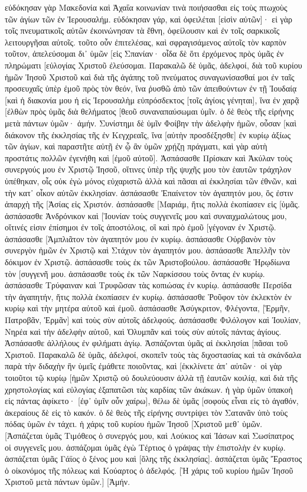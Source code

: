 εὐδόκησαν γὰρ Μακεδονία καὶ Ἀχαΐα κοινωνίαν τινὰ ποιήσασθαι εἰς τοὺς πτωχοὺς τῶν ἁγίων τῶν ἐν Ἰερουσαλήμ. 
εὐδόκησαν γάρ, καὶ ὀφειλέται [εἰσὶν αὐτῶν]· εἰ γὰρ τοῖς πνευματικοῖς αὐτῶν ἐκοινώνησαν τὰ ἔθνη, ὀφείλουσιν καὶ ἐν τοῖς σαρκικοῖς λειτουργῆσαι αὐτοῖς. 
τοῦτο οὖν ἐπιτελέσας, καὶ σφραγισάμενος αὐτοῖς τὸν καρπὸν τοῦτον, ἀπελεύσομαι δι᾽ ὑμῶν [εἰς Σπανίαν· 
οἶδα δὲ ὅτι ἐρχόμενος πρὸς ὑμᾶς ἐν πληρώματι [εὐλογίας Χριστοῦ ἐλεύσομαι. 
Παρακαλῶ δὲ ὑμᾶς, ἀδελφοί, διὰ τοῦ κυρίου ἡμῶν Ἰησοῦ Χριστοῦ καὶ διὰ τῆς ἀγάπης τοῦ πνεύματος συναγωνίσασθαί μοι ἐν ταῖς προσευχαῖς ὑπὲρ ἐμοῦ πρὸς τὸν θεόν, 
ἵνα ῥυσθῶ ἀπὸ τῶν ἀπειθούντων ἐν τῇ Ἰουδαίᾳ [καὶ ἡ διακονία μου ἡ εἰς Ἰερουσαλὴμ εὐπρόσδεκτος [τοῖς ἁγίοις γένηται], 
ἵνα ἐν χαρᾷ [ἐλθὼν πρὸς ὑμᾶς διὰ θελήματος [θεοῦ συναναπαύσωμαι ὑμῖν. 
ὁ δὲ θεὸς τῆς εἰρήνης μετὰ πάντων ὑμῶν· ἀμήν. 
Συνίστημι δὲ ὑμῖν Φοίβην τὴν ἀδελφὴν ἡμῶν, οὖσαν [καὶ διάκονον τῆς ἐκκλησίας τῆς ἐν Κεγχρεαῖς, 
ἵνα [αὐτὴν προσδέξησθε] ἐν κυρίῳ ἀξίως τῶν ἁγίων, καὶ παραστῆτε αὐτῇ ἐν ᾧ ἂν ὑμῶν χρῄζῃ πράγματι, καὶ γὰρ αὐτὴ προστάτις πολλῶν ἐγενήθη καὶ [ἐμοῦ αὐτοῦ]. 
Ἀσπάσασθε Πρίσκαν καὶ Ἀκύλαν τοὺς συνεργούς μου ἐν Χριστῷ Ἰησοῦ, 
οἵτινες ὑπὲρ τῆς ψυχῆς μου τὸν ἑαυτῶν τράχηλον ὑπέθηκαν, οἷς οὐκ ἐγὼ μόνος εὐχαριστῶ ἀλλὰ καὶ πᾶσαι αἱ ἐκκλησίαι τῶν ἐθνῶν, 
καὶ τὴν κατ᾽ οἶκον αὐτῶν ἐκκλησίαν. ἀσπάσασθε Ἐπαίνετον τὸν ἀγαπητόν μου, ὅς ἐστιν ἀπαρχὴ τῆς [Ἀσίας εἰς Χριστόν. 
ἀσπάσασθε [Μαριάμ, ἥτις πολλὰ ἐκοπίασεν εἰς [ὑμᾶς. 
ἀσπάσασθε Ἀνδρόνικον καὶ [Ἰουνίαν τοὺς συγγενεῖς μου καὶ συναιχμαλώτους μου, οἵτινές εἰσιν ἐπίσημοι ἐν τοῖς ἀποστόλοις, οἳ καὶ πρὸ ἐμοῦ [γέγοναν ἐν Χριστῷ. 
ἀσπάσασθε [Ἀμπλιᾶτον τὸν ἀγαπητόν μου ἐν κυρίῳ. 
ἀσπάσασθε Οὐρβανὸν τὸν συνεργὸν ἡμῶν ἐν Χριστῷ καὶ Στάχυν τὸν ἀγαπητόν μου. 
ἀσπάσασθε Ἀπελλῆν τὸν δόκιμον ἐν Χριστῷ. ἀσπάσασθε τοὺς ἐκ τῶν Ἀριστοβούλου. 
ἀσπάσασθε Ἡρῳδίωνα τὸν [συγγενῆ μου. ἀσπάσασθε τοὺς ἐκ τῶν Ναρκίσσου τοὺς ὄντας ἐν κυρίῳ. 
ἀσπάσασθε Τρύφαιναν καὶ Τρυφῶσαν τὰς κοπιώσας ἐν κυρίῳ. ἀσπάσασθε Περσίδα τὴν ἀγαπητήν, ἥτις πολλὰ ἐκοπίασεν ἐν κυρίῳ. 
ἀσπάσασθε Ῥοῦφον τὸν ἐκλεκτὸν ἐν κυρίῳ καὶ τὴν μητέρα αὐτοῦ καὶ ἐμοῦ. 
ἀσπάσασθε Ἀσύγκριτον, Φλέγοντα, [Ἑρμῆν, Πατροβᾶν, Ἑρμᾶν] καὶ τοὺς σὺν αὐτοῖς ἀδελφούς. 
ἀσπάσασθε Φιλόλογον καὶ Ἰουλίαν, Νηρέα καὶ τὴν ἀδελφὴν αὐτοῦ, καὶ Ὀλυμπᾶν καὶ τοὺς σὺν αὐτοῖς πάντας ἁγίους. 
Ἀσπάσασθε ἀλλήλους ἐν φιλήματι ἁγίῳ. Ἀσπάζονται ὑμᾶς αἱ ἐκκλησίαι [πᾶσαι τοῦ Χριστοῦ. 
Παρακαλῶ δὲ ὑμᾶς, ἀδελφοί, σκοπεῖν τοὺς τὰς διχοστασίας καὶ τὰ σκάνδαλα παρὰ τὴν διδαχὴν ἣν ὑμεῖς ἐμάθετε ποιοῦντας, καὶ [ἐκκλίνετε ἀπ᾽ αὐτῶν· 
οἱ γὰρ τοιοῦτοι τῷ κυρίῳ [ἡμῶν Χριστῷ οὐ δουλεύουσιν ἀλλὰ τῇ ἑαυτῶν κοιλίᾳ, καὶ διὰ τῆς χρηστολογίας καὶ εὐλογίας ἐξαπατῶσι τὰς καρδίας τῶν ἀκάκων. 
ἡ γὰρ ὑμῶν ὑπακοὴ εἰς πάντας ἀφίκετο· [ἐφ᾽ ὑμῖν οὖν χαίρω], θέλω δὲ ὑμᾶς [σοφοὺς εἶναι εἰς τὸ ἀγαθόν, ἀκεραίους δὲ εἰς τὸ κακόν. 
ὁ δὲ θεὸς τῆς εἰρήνης συντρίψει τὸν Σατανᾶν ὑπὸ τοὺς πόδας ὑμῶν ἐν τάχει. ἡ χάρις τοῦ κυρίου ἡμῶν Ἰησοῦ [Χριστοῦ μεθ᾽ ὑμῶν. 
[Ἀσπάζεται ὑμᾶς Τιμόθεος ὁ συνεργός μου, καὶ Λούκιος καὶ Ἰάσων καὶ Σωσίπατρος οἱ συγγενεῖς μου. 
ἀσπάζομαι ὑμᾶς ἐγὼ Τέρτιος ὁ γράψας τὴν ἐπιστολὴν ἐν κυρίῳ. 
ἀσπάζεται ὑμᾶς Γάϊος ὁ ξένος μου καὶ [ὅλης τῆς ἐκκλησίας]. ἀσπάζεται ὑμᾶς Ἔραστος ὁ οἰκονόμος τῆς πόλεως καὶ Κούαρτος ὁ ἀδελφός. 
[Ἡ χάρις τοῦ κυρίου ἡμῶν Ἰησοῦ Χριστοῦ μετὰ πάντων ὑμῶν.] [Ἀμήν. 
